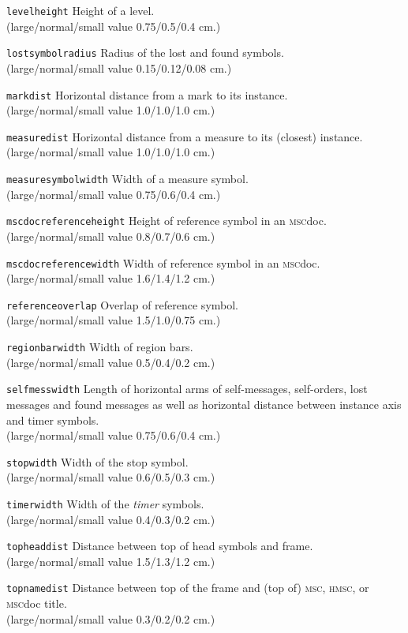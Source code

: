 \documentclass[a4paper]{article}
\newcommand{\cmd}[1]{\texttt{\bslash #1}}
\newcommand{\acro}[1]{{\scshape\lowercase{#1}}}
\newcommand\MSC{\acro{MSC}}
\newcommand\HMSC{\acro{HMSC}}
\newcommand{\MSCdoc}{\MSC{}doc}
\newcommand{\lnsvalue}[3]{large/normal/small value #1/#2/#3}
\newenvironment{defs}{%
  \begin{list}{}%
              {\setlength{\labelwidth}{0pt}%
               \setlength{\labelsep}{1em}%
               \setlength{\leftmargin}{1em}%
               \setlength{\parsep}{1ex}%
               \setlength{\listparindent}{0pt}%
               \setlength{\rightmargin}{0pt}%
               \renewcommand{\makelabel}[1]{##1}%
               \raggedright%
              }%
  }{%
  \end{list}}
\begin{document}
\begin{defs}
\item[\cmd{levelheight}]
Height of a level.\\
(\lnsvalue{0.75}{0.5}{0.4} cm.)

\item[\cmd{lostsymbolradius}]
Radius of the lost and found symbols.\\
(\lnsvalue{0.15}{0.12}{0.08} cm.)

\item[\cmd{markdist}]
Horizontal distance from a mark to its instance.\\
(\lnsvalue{1.0}{1.0}{1.0} cm.)

\item[\cmd{measuredist}]
Horizontal distance from a measure to its (closest) instance.\\
(\lnsvalue{1.0}{1.0}{1.0} cm.)

\item[\cmd{measuresymbolwidth}]
Width of a measure symbol.\\
(\lnsvalue{0.75}{0.6}{0.4} cm.)

\item[\cmd{mscdocreferenceheight}]
Height of reference symbol in an \MSCdoc.\\
(\lnsvalue{0.8}{0.7}{0.6} cm.)

\item[\cmd{mscdocreferencewidth}]
Width of reference symbol in an \MSCdoc.\\
(\lnsvalue{1.6}{1.4}{1.2} cm.)

\item[\cmd{referenceoverlap}]
Overlap of reference symbol.\\
(\lnsvalue{1.5}{1.0}{0.75} cm.)

\item[\cmd{regionbarwidth}]
Width of region bars.\\
(\lnsvalue{0.5}{0.4}{0.2} cm.)

\item[\cmd{selfmesswidth}] Length of horizontal arms of self-messages,
self-orders, lost messages and found messages as well as horizontal
distance between instance axis and timer symbols.\\
(\lnsvalue{0.75}{0.6}{0.4} cm.)

\item[\cmd{stopwidth}]
Width of the stop symbol.\\
(\lnsvalue{0.6}{0.5}{0.3} cm.)

\item[\cmd{timerwidth}]
Width of the \emph{timer} symbols.\\
(\lnsvalue{0.4}{0.3}{0.2} cm.)

\item[\cmd{topheaddist}]
Distance between top of head symbols and frame.\\
(\lnsvalue{1.5}{1.3}{1.2} cm.)

\item[\cmd{topnamedist}] Distance between top of the frame and
(top of) \MSC, \HMSC, or \MSCdoc{} title.\\
(\lnsvalue{0.3}{0.2}{0.2} cm.)

\end{defs}
\end{document}
